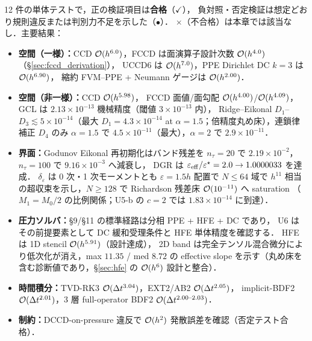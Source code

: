 \FloatBarrier

\begin{tcolorbox}[resultbox, title={U1--U12 単体検証の総括}]
12 件の単体テストで，正の検証項目は\textbf{合格}（$\checkmark$），
負対照・否定検証は想定どおり規則違反または判別力不足を示した（$\bullet$）．
$\times$（不合格）は本章では該当なし．主要結果：
\begin{itemize}[noitemsep]
  \item \textbf{空間（一様）：}CCD $\mathcal{O}(h^{6.0})$，FCCD は面演算子設計次数 $\mathcal{O}(h^{4.0})$（§\ref{sec:fccd_derivation}），
        UCCD6 は $\mathcal{O}(h^{7.0})$，PPE Dirichlet DC $k=3$ は $\mathcal{O}(h^{6.90})$，
        縮約 FVM--PPE + Neumann ゲージは $\mathcal{O}(h^{2.00})$．
  \item \textbf{空間（非一様）：}CCD $\mathcal{O}(h^{5.98})$，
        FCCD 面値/面勾配 $\mathcal{O}(h^{4.00})$/$\mathcal{O}(h^{4.09})$，
        GCL は $2.13 \times 10^{-13}$ 機械精度（閾値 $3\!\times\!10^{-13}$ 内），
        Ridge--Eikonal $D_1$--$D_3 \lesssim 5\!\times\!10^{-14}$（最大 $D_1\!=\!4.3\!\times\!10^{-14}$ at $\alpha\!=\!1.5$；倍精度丸め床），連鎖律補正 $D_4$ のみ
        $\alpha\!=\!1.5$ で $4.5\!\times\!10^{-11}$（最大），$\alpha\!=\!2$ で $2.9\!\times\!10^{-11}$．
  \item \textbf{界面：}Godunov Eikonal 再初期化はバンド残差を
        $n_\tau=20$ で $2.19\times10^{-2}$，$n_\tau=100$ で $9.16\times10^{-3}$ へ減衰し，
        DGR は $\varepsilon_{\mathrm{eff}}/\varepsilon^\star = 2.0 \to 1.0000033$ を達成．
        $\delta_\varepsilon$ は 0 次・1 次モーメントとも $\varepsilon=1.5h$ 配置で
        $N\!\le\!64$ 域で $h^{11}$ 相当の超収束を示し，$N\!\ge\!128$ で
        Richardson 残差床 $\mathcal{O}(10^{-11})$ へ saturation
        （$M_1 = M_0/2$ の比例関係；U5-b の $c=2$ では $1.83\!\times\!10^{-14}$ に到達）．
  \item \textbf{圧力ソルバ：}§9/§11 の標準経路は分相 PPE + HFE + DC であり，
        U6 はその前提要素として DC 緩和受理条件と HFE 単体精度を確認する．
        HFE は 1D stencil $\mathcal{O}(h^{5.91})$（設計達成），
        2D band は完全テンソル混合微分により低次化が消え，max $11.35$ / med $8.72$ の
        effective slope を示す（丸め床を含む診断値であり，§\ref{sec:hfe} の $\mathcal{O}(h^6)$ 設計と整合）．
  \item \textbf{時間積分：}TVD-RK3 $\mathcal{O}(\Delta t^{3.04})$，EXT2/AB2 $\mathcal{O}(\Delta t^{2.05})$，
        implicit-BDF2 $\mathcal{O}(\Delta t^{2.01})$，3 層 full-operator BDF2 $\mathcal{O}(\Delta t^{2.00\text{--}2.03})$．
  \item \textbf{制約：}DCCD-on-pressure 違反で $\mathcal{O}(h^2)$ 発散誤差を確認（否定テスト合格）．

\end{itemize}
\end{tcolorbox}
